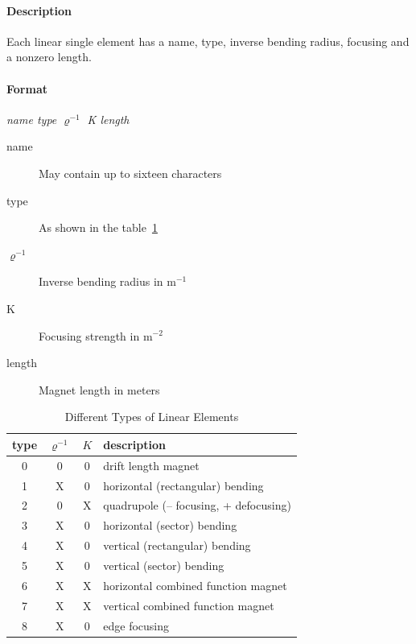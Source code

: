 \documentclass[a4paper,11pt]{report}
\begin{document}
\paragraph{Description}
Each linear single element has a name, type, inverse bending radius,
focusing and a nonzero length.

\paragraph{Format} {\em name type $ \varrho^{-1} $ K length}

\begin{description}
\item [name] May contain up to sixteen characters
\item [type] As shown in the table~\ref{T-LinEle}
\item [$ \varrho^{-1}$] Inverse bending radius in $\mathrm{m}^{-1}$
\item [K] Focusing strength in $\mathrm{m}^{-2}$
\item [length] Magnet length in meters
\end{description}

\begin{table}[h]
\caption{Different Types of Linear Elements}
\vspace{1em}
\label{T-LinEle}
\scriptsize \centering
\begin{tabular}{|c|c|c|l|}
  \hline
  type & $ \varrho^{-1} $ & $K$ & description \\
  \hline
  0 & 0 & 0 & drift length magnet \\
  1 & X & 0 & horizontal (rectangular) bending \\
  2 & 0 & X & quadrupole (-- focusing, + defocusing) \\
  3 & X & 0 & horizontal (sector) bending \\
  4 & X & 0 & vertical (rectangular) bending \\
  5 & X & 0 & vertical (sector) bending \\
  6 & X & X & horizontal combined function magnet \\
  7 & X & X & vertical combined function magnet \\
  8 & X & 0 & edge focusing \\
  \hline
\end{tabular}
\normalsize
\end{table}
\end{document}
